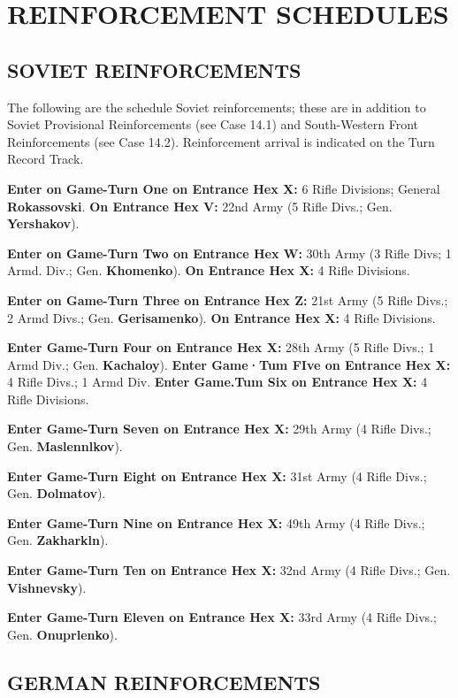 \section{REINFORCEMENT SCHEDULES}

\subsection{SOVIET REINFORCEMENTS}

The following are the schedule Soviet reinforcements; these are in addition to Soviet Provisional Reinforcements (see Case 14.1) and South-Western Front Reinforcements (see Case 14.2). Reinforcement arrival is indicated on the Turn Record Track.

\textbf{Enter on Game-Turn One on Entrance Hex X:}
6 Rifle Divisions; General \textbf{Rokassovski}.
\textbf{On Entrance Hex V:}
22nd Army (5 Rifle Divs.; Gen. \textbf{Yershakov}).

\textbf{Enter on Game-Turn Two on Entrance Hex W:}
30th Army (3 Rifle Divs; 1 Armd. Div.; Gen. \textbf{Khomenko}).
\textbf{On Entrance Hex X:}
4 Rifle Divisions.

\textbf{Enter on Game-Turn Three on Entrance Hex Z:}
21st Army (5 Rifle Divs.; 2 Armd Divs.; Gen. \textbf{Gerisamenko}).
\textbf{On Entrance Hex X:}
4 Rifle Divisions.

\textbf{Enter Game-Turn Four on Entrance Hex X:}
28th Army (5 Rifle Divs.; 1 Armd Div.; Gen. \textbf{Kachaloy}).
\textbf{Enter Game·Tum FIve on Entrance Hex X:}
4 Rifle Divs.; 1 Armd Div.
\textbf{Enter Game.Tum Six on Entrance Hex X:}
4 Rifle Divisions.

\textbf{Enter Game-Turn Seven on Entrance Hex X:}
29th Army (4 Rifle Divs.; Gen. \textbf{Maslennlkov}).

\textbf{Enter Game-Turn Eight on Entrance Hex X:}
31st Army (4 Rifle Divs.; Gen. \textbf{Dolmatov}).

\textbf{Enter Game-Turn Nine on Entrance Hex X:}
49th Army (4 Rifle Divs.; Gen. \textbf{Zakharkln}).

\textbf{Enter Game-Turn Ten on Entrance Hex X:}
32nd Army (4 Rifle Divs.; Gen. \textbf{Vishnevsky}).

\textbf{Enter Game-Turn Eleven on Entrance Hex X:}
33rd Army (4 Rifle Divs.; Gen. \textbf{Onuprlenko}).


\subsection{GERMAN REINFORCEMENTS}


